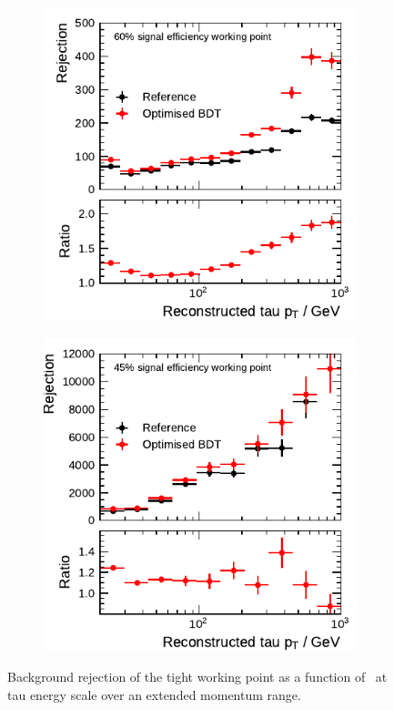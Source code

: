 \begin{figure}[htbp]
  \centering
  \begin{subfigure}[t]{0.48\textwidth}
    \centering
    \includegraphics{./figures/bdt_perf/post_optimisation/1p_highpt/rejection_tight_ratio_highpt.pdf}
  \end{subfigure}\hfill
  \begin{subfigure}[t]{0.48\textwidth}
    \centering
    \includegraphics{./figures/bdt_perf/post_optimisation/3p_highpt/rejection_tight_ratio_highpt.pdf}
  \end{subfigure}
  \caption{Background rejection of the tight working point as a function of
    \tauhadvis~\pt at tau energy scale over an extended momentum range.}
  \label{fig:rejection_highpt}
\end{figure}

